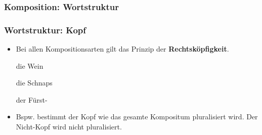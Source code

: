 \subsubsection{Komposition: Wortstruktur}


\begin{frame}
\frametitle{Wortstruktur: Kopf}

\begin{itemize}
	\item Bei allen Kompositionsarten gilt das Prinzip der \textbf{Rechtsköpfigkeit}.
	
	\settowidth{} 
	\ea 
		\ea die Wein \jambox{[Determinativkompositum]} 
		
			\z 		
		
		\ex die Schnaps 	\jambox{\hfill [Possessivkompositum]} 
			\z 
	
		
		\ex der Fürst- \jambox{[Kopulativkompositum]} 
			\z 		
		\z 
	\z 

	\item Bspw. bestimmt der Kopf wie das gesamte Kompositum pluralisiert wird. Der Nicht-Kopf wird nicht pluralisiert.

\end{itemize}

\end{frame}


